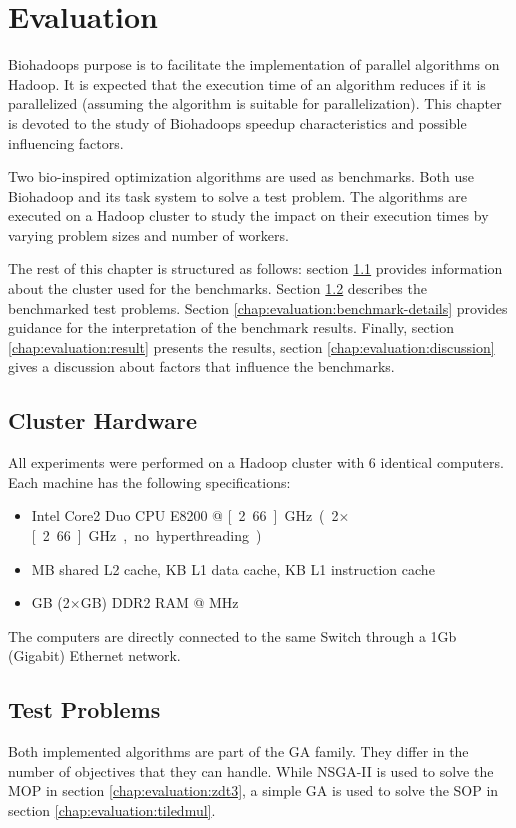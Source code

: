 \chapter{Evaluation}
\label{chap:evaluation}
Biohadoops purpose is to facilitate the implementation of parallel algorithms on Hadoop. It is expected that the execution time of an algorithm reduces if it is parallelized (assuming the algorithm is suitable for parallelization). This chapter is devoted to the study of Biohadoops speedup characteristics and possible influencing factors.

Two bio-inspired optimization algorithms are used as benchmarks. Both use Biohadoop and its task system to solve a test problem. The algorithms are executed on a Hadoop cluster to study the impact on their execution times by varying problem sizes and number of workers.

The rest of this chapter is structured as follows: section \ref{chap:evaluation:cluster} provides information about the cluster used for the benchmarks. Section \ref{chap:evaluation:testproblems} describes the benchmarked test problems. Section \ref{chap:evaluation:benchmark-details} provides guidance  for the interpretation of the benchmark results. Finally, section \ref{chap:evaluation:result} presents the results, section \ref{chap:evaluation:discussion} gives a discussion about factors that influence the benchmarks.

\section{Cluster Hardware}
\label{chap:evaluation:cluster}
All experiments were performed on a Hadoop cluster with 6 identical computers. Each machine has the following specifications:

\begin{itemize}
  \item Intel Core2 Duo CPU E8200 @ \unit[2.66]{GHz} (2$\times$\unit[2.66]{GHz}, no hyperthreading)
  \item \unit[6]{MB} shared L2 cache, \unit[32]{KB} L1 data cache, \unit[32]{KB} L1 instruction cache
  \item \unit[4]{GB} (2$\times$\unit[2]{GB}) DDR2 RAM @ \unit[667]{MHz}
\end{itemize}

The computers are directly connected to the same Switch through a 1Gb (Gigabit) Ethernet network.

\section{Test Problems}
\label{chap:evaluation:testproblems}
Both implemented algorithms are part of the GA family. They differ in the number of objectives that they can handle. While NSGA-II is used to solve the MOP in section \ref{chap:evaluation:zdt3}, a simple GA is used to solve the SOP in section \ref{chap:evaluation:tiledmul}.

